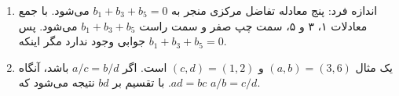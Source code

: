 \documentclass[12pt,a4paper]{article}
\begin{document}
{\begin{enumerate}
			\item اندازه فرد: پنج معادله تفاضل مرکزی منجر به $b_1+b_3+b_5=0$ می‌شود. با جمع معادلات ۱، ۳ و ۵، سمت چپ صفر و سمت راست $b_1+b_3+b_5$ می‌شود. پس جوابی وجود ندارد مگر اینکه $b_1+b_3+b_5=0$.
			
			\item یک مثال $(a,b)=(3,6)$ و $(c,d)=(1,2)$ است. اگر $a/c = b/d$ باشد، آنگاه $ad=bc$. با تقسیم بر $bd$ نتیجه می‌شود که $a/b=c/d$.
			
		\end{enumerate}
		
	}
\end{document}
